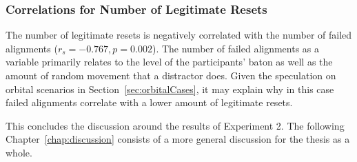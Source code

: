 \subsubsection{Correlations for Number of Legitimate Resets}
The number of legitimate resets is negatively correlated with the number of failed alignments ($r_s = -0.767, p = 0.002$). The number of failed alignments as a variable primarily relates to the level of the participants' baton as well as the amount of random movement that a distractor does. Given the speculation on orbital scenarios in Section~\ref{sec:orbitalCases}, it may explain why in this case failed alignments correlate with a lower amount of legitimate resets. 

This concludes the discussion around the results of Experiment 2. The following Chapter~\ref{chap:discussion} consists of a more general discussion for the thesis as a whole.